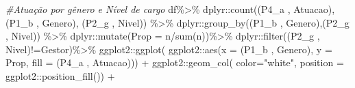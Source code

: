 \documentclass[
]{article}
\newenvironment{Shaded}{\begin{snugshade}}{\end{snugshade}}
\newcommand{\AttributeTok}[1]{\textcolor[rgb]{0.77,0.63,0.00}{#1}}
\newcommand{\CommentTok}[1]{\textcolor[rgb]{0.56,0.35,0.01}{\textit{#1}}}
\newcommand{\FunctionTok}[1]{\textcolor[rgb]{0.00,0.00,0.00}{#1}}
\newcommand{\NormalTok}[1]{#1}
\newcommand{\SpecialCharTok}[1]{\textcolor[rgb]{0.00,0.00,0.00}{#1}}
\newcommand{\StringTok}[1]{\textcolor[rgb]{0.31,0.60,0.02}{#1}}
\begin{document}
\begin{Shaded}
\begin{Highlighting}[]
\CommentTok{\#Atuação por gênero e Nível de cargo}
\NormalTok{df}\SpecialCharTok{\%\textgreater{}\%}
\NormalTok{  dplyr}\SpecialCharTok{::}\FunctionTok{count}\NormalTok{(}\StringTok{\textasciigrave{}}\AttributeTok{(\textquotesingle{}P4\_a \textquotesingle{}, \textquotesingle{}Atuacao\textquotesingle{})}\StringTok{\textasciigrave{}}\NormalTok{,}\StringTok{\textasciigrave{}}\AttributeTok{(\textquotesingle{}P1\_b \textquotesingle{}, \textquotesingle{}Genero\textquotesingle{})}\StringTok{\textasciigrave{}}\NormalTok{, }\StringTok{\textasciigrave{}}\AttributeTok{(\textquotesingle{}P2\_g \textquotesingle{}, \textquotesingle{}Nivel\textquotesingle{})}\StringTok{\textasciigrave{}}\NormalTok{) }\SpecialCharTok{\%\textgreater{}\%}
\NormalTok{  dplyr}\SpecialCharTok{::}\FunctionTok{group\_by}\NormalTok{(}\StringTok{\textasciigrave{}}\AttributeTok{(\textquotesingle{}P1\_b \textquotesingle{}, \textquotesingle{}Genero\textquotesingle{})}\StringTok{\textasciigrave{}}\NormalTok{,}\StringTok{\textasciigrave{}}\AttributeTok{(\textquotesingle{}P2\_g \textquotesingle{}, \textquotesingle{}Nivel\textquotesingle{})}\StringTok{\textasciigrave{}}\NormalTok{) }\SpecialCharTok{\%\textgreater{}\%}
\NormalTok{  dplyr}\SpecialCharTok{::}\FunctionTok{mutate}\NormalTok{(}\AttributeTok{Prop =}\NormalTok{ n}\SpecialCharTok{/}\FunctionTok{sum}\NormalTok{(n))}\SpecialCharTok{\%\textgreater{}\%}
\NormalTok{  dplyr}\SpecialCharTok{::}\FunctionTok{filter}\NormalTok{(}\StringTok{\textasciigrave{}}\AttributeTok{(\textquotesingle{}P2\_g \textquotesingle{}, \textquotesingle{}Nivel\textquotesingle{})}\StringTok{\textasciigrave{}}\SpecialCharTok{!=}\StringTok{\textquotesingle{}Gestor\textquotesingle{}}\NormalTok{)}\SpecialCharTok{\%\textgreater{}\%}
\NormalTok{  ggplot2}\SpecialCharTok{::}\FunctionTok{ggplot}\NormalTok{(}
\NormalTok{    ggplot2}\SpecialCharTok{::}\FunctionTok{aes}\NormalTok{(}\AttributeTok{x =} \StringTok{\textasciigrave{}}\AttributeTok{(\textquotesingle{}P1\_b \textquotesingle{}, \textquotesingle{}Genero\textquotesingle{})}\StringTok{\textasciigrave{}}\NormalTok{, }\AttributeTok{y =}\NormalTok{ Prop,}
                 \AttributeTok{fill =} \StringTok{\textasciigrave{}}\AttributeTok{(\textquotesingle{}P4\_a \textquotesingle{}, \textquotesingle{}Atuacao\textquotesingle{})}\StringTok{\textasciigrave{}}\NormalTok{)) }\SpecialCharTok{+}
\NormalTok{  ggplot2}\SpecialCharTok{::}\FunctionTok{geom\_col}\NormalTok{( }\AttributeTok{color=}\StringTok{"white"}\NormalTok{,}
                     \AttributeTok{position =}\NormalTok{ ggplot2}\SpecialCharTok{::}\FunctionTok{position\_fill}\NormalTok{()) }\SpecialCharTok{+}

\end{Highlighting}
\end{Shaded}
\end{document}
